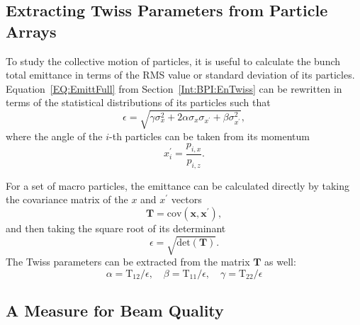 \subsection{Extracting Twiss Parameters from Particle Arrays}
\label{Sim:Analysis:EnTwiss}

To study the collective motion of particles, it is useful to calculate the bunch total emittance in terms of the RMS value or standard deviation of its particles.
Equation~\ref{EQ:EmittFull} from Section~\ref{Int:BPI:EnTwiss} can be rewritten in terms of the statistical distributions of its particles such that
\begin{equation}
    \epsilon = \sqrt{\gamma\sigma_{x}^{2} + 2\alpha\sigma_{x}\sigma_{x^{\prime}} + \beta\sigma_{x^{\prime}}^{2}}, \label{EQ:Emitt}
\end{equation}
where the angle of the $i$-th particles can be taken from its momentum
\begin{equation}
    x_{i}^{\prime} = \frac{p_{i,x}}{p_{i,z}}.
\end{equation}

For a set of macro particles, the emittance can be calculated directly by taking the covariance matrix of the $x$ and $x^{\prime}$ vectors
\begin{equation}
    \mathbf{T} = \mathrm{cov}\left(\mathbf{x}, \mathbf{x}^{\prime}\right), \label{EQ:ECalc1}
\end{equation}
and then taking the square root of its determinant
\begin{equation}
    \epsilon = \sqrt{\mathrm{det}\left(\mathbf{T}\right)}. \label{EQ:ECalc2}
\end{equation}
The Twiss parameters can be extracted from the matrix $\mathbf{T}$ as well:
\begin{equation}
    \alpha = \mathrm{T}_{12}/\epsilon, \quad
    \beta  = \mathrm{T}_{11}/\epsilon, \quad
    \gamma = \mathrm{T}_{22}/\epsilon
\end{equation}

\subsection{A Measure for Beam Quality}
\label{Sim:Analysis:QTilde}

